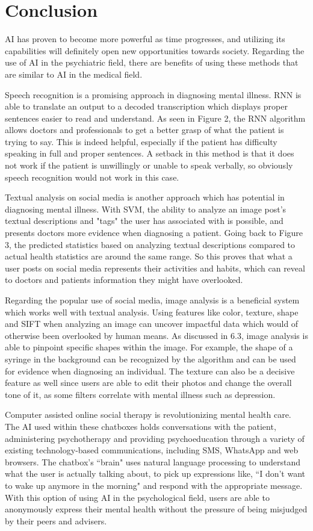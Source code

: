 \documentclass[11pt,technote,twocolumn]{IEEEtran}
\begin{document}
\section{Conclusion}
AI has proven to become more powerful as time progresses, and utilizing its capabilities will definitely open new opportunities towards society. Regarding the use of AI in the psychiatric field, there are benefits of using these methods that are similar to AI in the medical field. 
\par
Speech recognition is a promising approach in diagnosing mental illness. RNN is able to translate an output to a decoded transcription which displays proper sentences easier to read and understand. As seen in Figure 2, the RNN algorithm allows doctors and professionals to get a better grasp of what the patient is trying to say. This is indeed helpful, especially if the patient has difficulty speaking in full and proper sentences. A setback in this method is that it does not work if the patient is unwillingly or unable to speak verbally, so obviously speech recognition would not work in this case.
\par
Textual analysis on social media is another approach which has potential in diagnosing mental illness. With SVM, the ability to analyze an image post's textual descriptions and "tags" the user has associated with is possible, and presents doctors more evidence when diagnosing a patient. Going back to Figure 3, the predicted statistics based on analyzing textual descriptions compared to actual health statistics are around the same range. So this proves that what a user posts on social media represents their activities and habits, which can reveal to doctors and patients information they might have overlooked. 
\par
Regarding the popular use of social media, image analysis is a beneficial system which works well with textual analysis. Using features like color, texture, shape and SIFT when analyzing an image can uncover impactful data which would of otherwise been overlooked by human means. As discussed in 6.3, image analysis is able to pinpoint specific shapes within the image. For example, the shape of a syringe in the background can be recognized by the algorithm and can be used for evidence when diagnosing an individual. The texture can also be a decisive feature as well since users are able to edit their photos and change the overall tone of it, as some filters correlate with mental illness such as depression.
\par
Computer assisted online social therapy is revolutionizing mental health care. The AI used within these chatboxes holds conversations with the patient, administering psychotherapy and providing psychoeducation through a variety of existing technology-based communications, including SMS, WhatsApp and web browsers. The chatbox's ``brain" uses natural language processing to understand what the user is actually talking about, to pick up expressions like, ``I don't want to wake up anymore in the morning" and respond with the appropriate message. With this option of using AI in the psychological field, users are able to anonymously express their mental health without the pressure of being misjudged by their peers and advisers.
\end{document}
